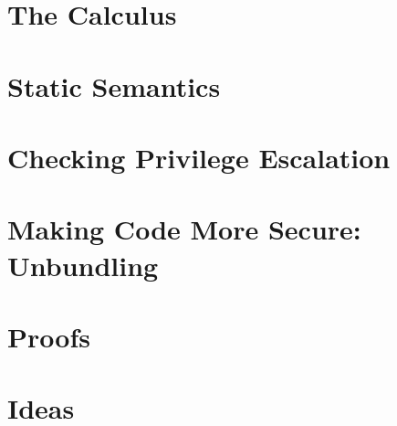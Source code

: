 \documentclass[[12pt,a4paper,twoside,openrigh]{article}
\begin{document}
\section{The Calculus}
\label{sec:calculus}


\section{Static Semantics}
\label{sec:statics}


\section{Checking Privilege Escalation}
\label{sec:privesc}

\newpage

\section{Making Code More Secure: Unbundling}
\label{sec:flow}

\newpage

\section{Proofs}
\label{sec:proofs}

\newpage

\section{Ideas}
\label{sec:ideas}
\end{document}
